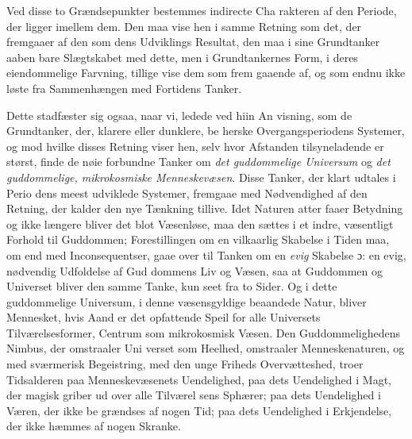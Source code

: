 \documentclass[12pt,a4paper]{book}
\begin{document}
Ved disse to Grændsepunkter bestemmes indirecte Cha\-%
rakteren af den Periode, der ligger imellem dem. Den maa
vise hen i samme Retning som det, der fremgaaer af den som
dens Udviklings Resultat, den maa i sine Grundtanker aaben\-%
bare Slægtskabet med dette, men i Grundtankernes Form, i
deres eiendommelige Farvning, tillige vise dem som frem\-%
gaaende af, og som endnu ikke løste fra Sammenhængen med
Fortidens Tanker.

Dette stadfæster sig ogsaa, naar vi, ledede ved hiin An\-%
visning, som de Grundtanker, der, klarere eller dunklere, be\-%
herske Overgangsperiodens Systemer, og mod hvilke disses
Retning viser hen, selv hvor Afstanden tilsyneladende er størst,
finde de nøie forbundne Tanker om \emph{det guddommelige
Universum} og \emph{det guddommelige, mikrokosmiske
Menneskevæsen}. Disse Tanker, der klart udtales i Perio\-%
dens meest udviklede Systemer, fremgaae med Nødvendighed
af den Retning, der kalder den nye Tænkning tillive. Idet
Naturen atter faaer Betydning og ikke længere bliver det blot
Væsenløse, maa den sættes i et indre, væsentligt Forhold til
Guddommen; Forestillingen om en vilkaarlig Skabelse i Tiden
maa, om end med Inconsequentser, gaae over til Tanken om
en \emph{evig} Skabelse ɔ: en evig, nødvendig Udfoldelse af Gud\-%
dommens Liv og Væsen, saa at Guddommen og Universet
bliver den samme Tanke, kun seet fra to Sider. Og i dette
guddommelige Universum, i denne væsensgyldige beaandede
Natur, bliver Mennesket, hvis Aand er det opfattende Speil for
alle Universets Tilværelsesformer, Centrum som mikrokosmisk
Væsen. Den Guddommelighedens Nimbus, der omstraaler Uni\-%
verset som Heelhed, omstraaler Menneskenaturen, og med
sværmerisk Begeistring, med den unge Friheds Overvætteshed,
troer Tidsalderen paa Menneskevæsenets Uendelighed, paa dets
Uendelighed i Magt, der magisk griber ud over alle Tilværel\-%
sens Sphærer; paa dets Uendelighed i Væren, der ikke be\-%
grændses af nogen Tid; paa dets Uendelighed i Erkjendelse,
der ikke hæmmes af nogen Skranke.
\end{document}
